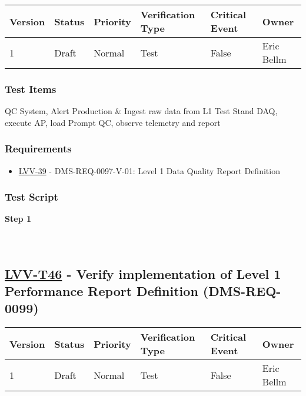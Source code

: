 \begin{longtable}[]{@{}llllll@{}}
\toprule
Version & Status & Priority & Verification Type & Critical Event &
Owner\tabularnewline
\midrule
\endhead
1 & Draft & Normal & Test & False & Eric Bellm\tabularnewline
\bottomrule
\end{longtable}

\hypertarget{test-items-21}{%
\subsubsection{Test Items}\label{test-items-21}}

QC System, Alert Production \& Ingest raw data from L1 Test Stand DAQ,
execute AP, load Prompt QC, observe telemetry and report

\hypertarget{requirements-22}{%
\subsubsection{Requirements}\label{requirements-22}}

\begin{itemize}
\tightlist
\item
  \href{https://jira.lsstcorp.org/browse/LVV-39}{LVV-39} -
  DMS-REQ-0097-V-01: Level 1 Data Quality Report Definition
\end{itemize}

\hypertarget{test-script-22}{%
\subsubsection{Test Script}\label{test-script-22}}

\textbf{Step 1}\\
~\\
~\\

\hypertarget{lvv-t46---verify-implementation-of-level-1-performance-report-definition-dms-req-0099}{%
\subsection{\texorpdfstring{\href{https://jira.lsstcorp.org/secure/Tests.jspa\#/testCase/LVV-T46}{LVV-T46}
- Verify implementation of Level 1 Performance Report Definition
(DMS-REQ-0099)}{LVV-T46 - Verify implementation of Level 1 Performance Report Definition (DMS-REQ-0099)}}\label{lvv-t46---verify-implementation-of-level-1-performance-report-definition-dms-req-0099}}

\begin{longtable}[]{@{}llllll@{}}
\toprule
Version & Status & Priority & Verification Type & Critical Event &
Owner\tabularnewline
\midrule
\endhead
1 & Draft & Normal & Test & False & Eric Bellm\tabularnewline
\bottomrule
\end{longtable}

